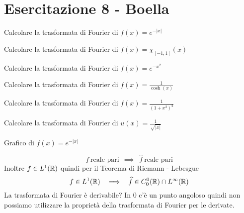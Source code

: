 \chapter{Esercitazione 8 - Boella}

\ParteEsercizi

\Esercizio{}

Calcolare la trasformata di Fourier di $f(x) = e^{- |x|}$

\Esercizio{}

Calcolare la trasformata di Fourier di $f(x) = \chi_{[ - 1, 1]} (x)$

\Esercizio{}

Calcolare la trasformata di Fourier di $f(x) = e^{- x^{2}}$

\Esercizio{}

Calcolare la trasformata di Fourier di $f(x) = \frac{1}{\cosh (x)}$

\Esercizio{}

Calcolare la trasformata di Fourier di $f(x) = \frac{1}{\left(1 + x^{2}\right)^{2}}$

\Esercizio{}

Calcolare la trasformata di Fourier di $u(x) = \frac{1}{\sqrt{|x|}}$

\ParteSoluzioni

\Soluzione

Grafico di $f(x) = e^{- | x|}$

\begin{equation*}
f\ \text{reale pari} \ \ \implies \ \ \hat{f} \ \text{reale pari}
\end{equation*}
Inoltre $f\in L^{1}(\mathbb{R})$ quindi per il Teorema di Riemann - Lebesgue
\begin{equation*}
f\in L^{1}(\mathbb{R}) \ \ \implies \ \ \widehat{f} \in C^{0}_{0}(\mathbb{R}) \cap L^{\infty}(\mathbb{R})
\end{equation*}
La trasformata di Fourier è derivabile? In $0$ c'è un punto angoloso quindi non possiamo utilizzare la proprietà della trasformata di Fourier per le derivate.

